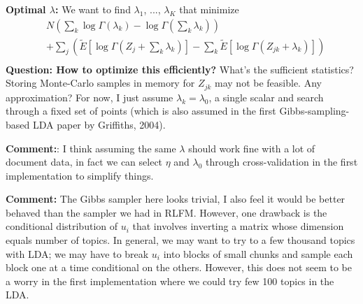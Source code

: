 {\bf Optimal $\lambda$:} We want to find $\lambda_1$, ..., $\lambda_K$ that minimize
\begin{equation*}
\begin{split}
& N \left( \sum_k \log\Gamma(\lambda_k) 
		- \log\Gamma(\textstyle\sum_k \lambda_k) \right) \\
&		+ \sum_j \left(
				\tilde{E}[\log\Gamma\left(Z_j + \textstyle\sum_k \lambda_k\right)]
				- \sum_k \tilde{E}[\log\Gamma(Z_{jk} + \lambda_k)]
	\right)\\
\end{split}
\end{equation*}
{\bf Question: How to optimize this efficiently?} What's the sufficient statistics? Storing Monte-Carlo samples in memory for $Z_{jk}$ may not be feasible. Any approximation? For now, I just assume $\lambda_k = \lambda_0$, a single scalar and search through a fixed set of points (which is also assumed in the first Gibbs-sampling-based LDA paper by Griffiths, 2004).

{\bf Comment:}: I think assuming the same $\lambda$ should work fine with a lot of document data, in fact we can select $\eta$ and $\lambda_0$ through cross-validation in the first  implementation to simplify things.

{\bf Comment:} The Gibbs sampler here looks trivial, I also feel it would be better behaved than the sampler we had in RLFM. However, one drawback is the conditional
distribution of $u_i$ that involves inverting a matrix whose dimension equals number of topics. In general, we may want to try to a few thousand topics with LDA; we may have to break $u_i$ into blocks of small chunks and sample each block one at a time conditional on the others. However, this does not seem to be a worry in the first implementation where we could try few 100 topics in the LDA.
